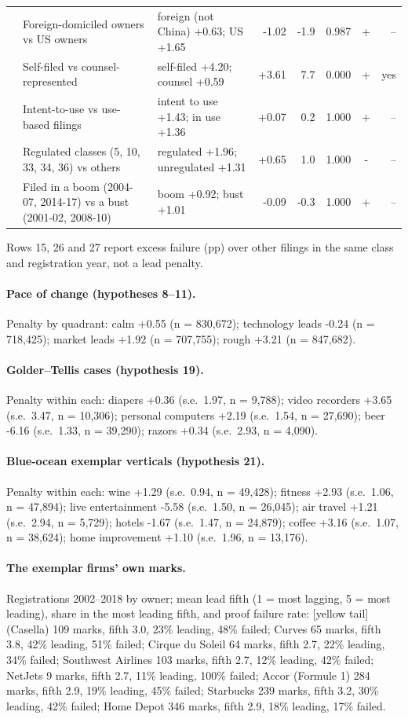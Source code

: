 {\begin{longtable}{>{\raggedright\arraybackslash}p{0.7cm}>{\raggedright\arraybackslash}p{4.6cm}>{\raggedright\arraybackslash}p{2.9cm}rrrcr}
30 & Foreign-domiciled owners vs US owners & foreign (not China) +0.63; US +1.65 & -1.02 & -1.9 & 0.987 & + & -- \\
31 & Self-filed vs counsel-represented & self-filed +4.20; counsel +0.59 & +3.61 & 7.7 & 0.000 & + & yes \\
32 & Intent-to-use vs use-based filings & intent to use +1.43; in use +1.36 & +0.07 & 0.2 & 1.000 & + & -- \\
33 & Regulated classes (5, 10, 33, 34, 36) vs others & regulated +1.96; unregulated +1.31 & +0.65 & 1.0 & 1.000 & - & -- \\
34 & Filed in a boom (2004-07, 2014-17) vs a bust (2001-02, 2008-10) & boom +0.92; bust +1.01 & -0.09 & -0.3 & 1.000 & + & -- \\
\bottomrule\end{longtable}}

Rows 15, 26 and 27 report excess failure (pp) over other filings in the same class and registration year, not a lead penalty.

\paragraph{Pace of change (hypotheses 8--11).} Penalty by quadrant: calm +0.55 (n = 830,672); technology leads -0.24 (n = 718,425); market leads +1.92 (n = 707,755); rough +3.21 (n = 847,682).
\paragraph{Golder--Tellis cases (hypothesis 19).} Penalty within each: diapers +0.36 (s.e.\ 1.97, n = 9,788); video recorders +3.65 (s.e.\ 3.47, n = 10,306); personal computers +2.19 (s.e.\ 1.54, n = 27,690); beer -6.16 (s.e.\ 1.33, n = 39,290); razors +0.34 (s.e.\ 2.93, n = 4,090).
\paragraph{Blue-ocean exemplar verticals (hypothesis 21).} Penalty within each: wine +1.29 (s.e.\ 0.94, n = 49,428); fitness +2.93 (s.e.\ 1.06, n = 47,894); live entertainment -5.58 (s.e.\ 1.50, n = 26,045); air travel +1.21 (s.e.\ 2.94, n = 5,729); hotels -1.67 (s.e.\ 1.47, n = 24,879); coffee +3.16 (s.e.\ 1.07, n = 38,624); home improvement +1.10 (s.e.\ 1.96, n = 13,176).
\paragraph{The exemplar firms' own marks.} Registrations 2002--2018 by owner; mean lead fifth (1 = most lagging, 5 = most leading), share in the most leading fifth, and proof failure rate: {[}yellow tail{]} (Casella) 109 marks, fifth 3.0, 23\% leading, 48\% failed; Curves 65 marks, fifth 3.8, 42\% leading, 51\% failed; Cirque du Soleil 64 marks, fifth 2.7, 22\% leading, 34\% failed; Southwest Airlines 103 marks, fifth 2.7, 12\% leading, 42\% failed; NetJets 9 marks, fifth 2.7, 11\% leading, 100\% failed; Accor (Formule 1) 284 marks, fifth 2.9, 19\% leading, 45\% failed; Starbucks 239 marks, fifth 3.2, 30\% leading, 42\% failed; Home Depot 346 marks, fifth 2.9, 18\% leading, 17\% failed.
